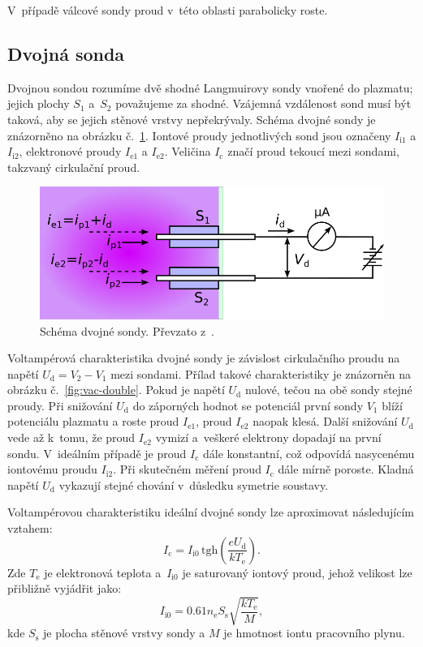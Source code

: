 \documentclass{protokol}
\newcommand\elemcharge{e}
\newcommand\boltzmann{k}
\newcommand{\tgh}{\mathrm{tgh}}
\newcommand\denselec{n_\mathrm{e}}
\newcommand\probesurf{S}
\newcommand\sheathsurf{S_\mathrm{s}}
\newcommand\tempelec{T_\mathrm{e}}
\newcommand\massion{M}
\newcommand\iioni{I_{\mathrm{i}1}}
\newcommand\iionii{I_{\mathrm{i}2}}
\newcommand\iionsat{I_{\mathrm{i}0}}
\newcommand\ieleci{I_{\mathrm{e}1}}
\newcommand\ielecii{I_{\mathrm{e}2}}
\newcommand\idouble{I_{\mathrm{c}}}
\newcommand\poti{V_1}
\newcommand\potii{V_2}
\newcommand\udouble{U_\mathrm{d}}
\begin{document}
V~případě válcové sondy proud v~této oblasti parabolicky roste.

\subsection{Dvojná sonda}
Dvojnou sondou rozumíme dvě shodné Langmuirovy sondy vnořené do plazmatu;
jejich plochy $\probesurf_1$ a~$\probesurf_2$ považujeme za shodné.
Vzájemná vzdálenost sond musí být taková, aby se jejich stěnové vrstvy
nepřekrývaly.
Schéma dvojné sondy je znázorněno na obrázku č.~\ref{fig:probe-double}.
Iontové proudy jednotlivých sond jsou označeny $\iioni$ a $\iionii$,
elektronové proudy $\ieleci$ a $\ielecii$.
Veličina $\idouble$ značí proud tekoucí mezi sondami,
takzvaný cirkulační proud.

\begin{figure}[hbp]
	\centering
	\includegraphics{probe-double}
	\caption{Schéma dvojné sondy.
		Převzato z~\autocite{assignment-doubleprobe}.}
	\label{fig:probe-double}
\end{figure}

Voltampérová charakteristika dvojné sondy je závislost cirkulačního proudu
na napětí $\udouble = \potii - \poti$ mezi sondami.
Přílad takové charakteristiky je znázorněn na obrázku č.~\ref{fig:vac-double}.
Pokud je napětí $\udouble$ nulové, tečou na obě sondy stejné proudy.
Při snižování $\udouble$ do záporných hodnot se potenciál první sondy $\poti$
blíží potenciálu plazmatu a roste proud $\ieleci$,
proud $\ielecii$ naopak klesá.
Další snižování $\udouble$ vede až k~tomu,
že proud $\ielecii$ vymizí a~veškeré elektrony dopadají na první sondu.
V~ideálním případě je proud $\idouble$ dále konstantní,
což odpovídá nasycenému iontovému proudu $\iionii$.
Při skutečném měření proud $\idouble$ dále mírně poroste.
Kladná napětí $\udouble$ vykazují stejné chování v~důsledku symetrie soustavy.

Voltampérovou charakteristiku ideální dvojné sondy lze aproximovat
následujícím vztahem:
\begin{equation}
	\label{eq:double-idouble}
	\idouble = \iionsat \, \tgh \left(
		\frac{\elemcharge\udouble}{\boltzmann\tempelec} \right).
\end{equation}
Zde $\tempelec$ je elektronová teplota
a~$\iionsat$ je saturovaný iontový proud, jehož velikost lze přibližně
vyjádřit jako:
\begin{equation}
	\label{eq:double-iionsat}
	\iionsat = \num{0.61} \denselec \sheathsurf
		\sqrt{\frac{\boltzmann\tempelec}{\massion}},
\end{equation}
kde $\sheathsurf$ je plocha stěnové vrstvy sondy
a $\massion$ je hmotnost iontu pracovního plynu.
\end{document}
